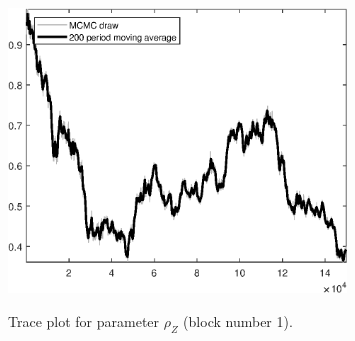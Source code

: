 \begin{figure}[H]
\centering
  \includegraphics[width=0.8\textwidth]{BRS_sectoral_KK/graphs/TracePlot_rho_Z_blck_1}\\
    \caption{Trace plot for parameter ${\rho_Z}$ (block number 1).}
\end{figure}
